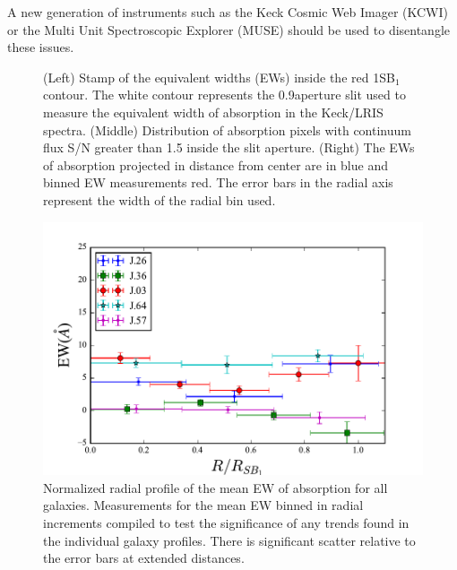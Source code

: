 \documentclass[twocolumn]{aastex61}
\begin{document}
A new generation of instruments such as the Keck Cosmic Web Imager (KCWI) or the Multi Unit Spectroscopic Explorer (MUSE) should be used to disentangle these issues.


\begin{figure}
\centering
{}
\caption{(Left) Stamp of the equivalent widths (EWs) inside the red 1SB$_1$ contour. The white contour represents the 0.9\arcsec aperture slit used to measure the equivalent width of absorption in the Keck/LRIS spectra. (Middle) Distribution of absorption pixels with continuum flux S/N greater than 1.5 inside the slit aperture. (Right) The EWs of absorption projected in distance from center are in blue and binned EW measurements red. The error bars in the radial axis represent the width of the radial bin used.}
\label{fig:ews}
\end{figure}


\begin{figure}[!htb]
\centering
\includegraphics[scale=0.9]{../Figures/ew_comb.pdf}
\caption{Normalized radial profile of the mean EW of  absorption for all galaxies. Measurements for the mean EW binned in radial increments compiled to test the significance of any trends found in the individual galaxy profiles. There is significant scatter relative to the error bars at extended distances.}
\label{fig:ew_comb}
\end{figure}
\end{document}

